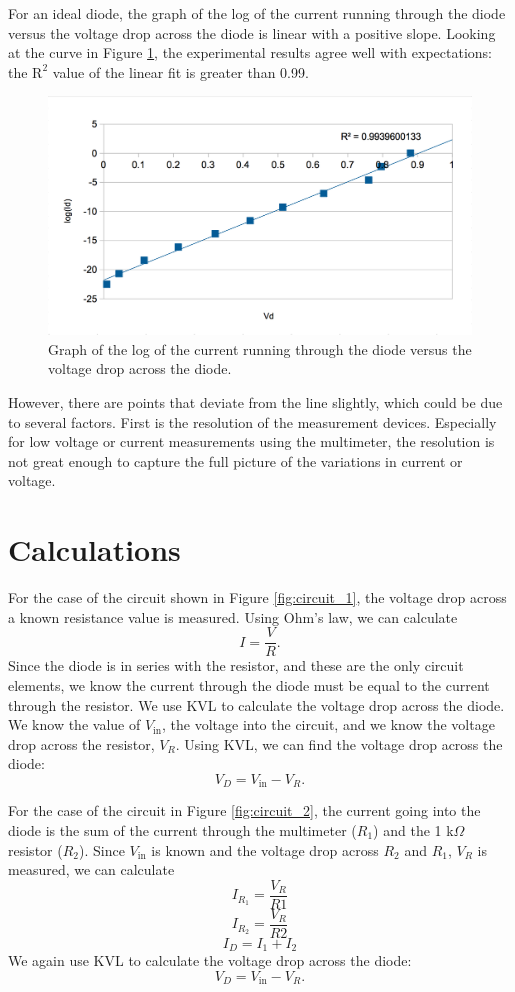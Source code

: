 \documentclass[12pt,letterpaper]{report}
\begin{document}
For an ideal diode, the graph of the log of the current running through the diode versus the voltage drop across the diode is linear with a positive slope. Looking at the curve in Figure \ref{fig:graph}, the experimental results agree well with expectations: the $\text{R}^2$ value of the linear fit is greater than 0.99.

\begin{figure}[H]
\centering
\includegraphics[width=0.9\linewidth, keepaspectratio=true]{lab3/lab3_graph.png}
\caption{Graph of the log of the current running through the diode versus the voltage drop across the diode.} %
\label{fig:graph}
\end{figure}

 However, there are points that deviate from the line slightly, which could be due to several factors. First is the resolution of the measurement devices. Especially for low voltage or current measurements using the multimeter, the resolution is not great enough to capture the full picture of the variations in current or voltage.

\section*{Calculations}

For the case of the circuit shown in Figure \ref{fig:circuit_1}, the voltage drop across a known resistance value is measured. Using Ohm's law, we can calculate
$$
I = \frac{V}{R}.
$$
Since the diode is in series with the resistor, and these are the only circuit elements, we know the current through the diode must be equal to the current through the resistor. 
We use KVL to calculate the voltage drop across the diode. We know the value of $V_{\text{in}}$, the voltage into the circuit, and we know the voltage drop across the resistor, $V_R$. Using KVL, we can find the voltage drop across the diode:
$$
V_D = V_{\text{in}} - V_R.
$$

For the case of the circuit in Figure \ref{fig:circuit_2}, the current going into the diode is the sum of the current through the multimeter ($R_1$) and the 1 k$\Omega$ resistor ($R_2$). Since $V_{\text{in}}$ is known and the voltage drop across $R_2$ and $R_1$, $V_R$ is measured, we can calculate
$$
I_{R_1} = \frac{V_R}{R1}
$$
$$
I_{R_2} = \frac{V_R}{R2}
$$
$$
I_D = I_1 + I_2
$$
We again use KVL to calculate the voltage drop across the diode:
$$
V_D = V_{\text{in}} - V_R.
$$
\end{document}
